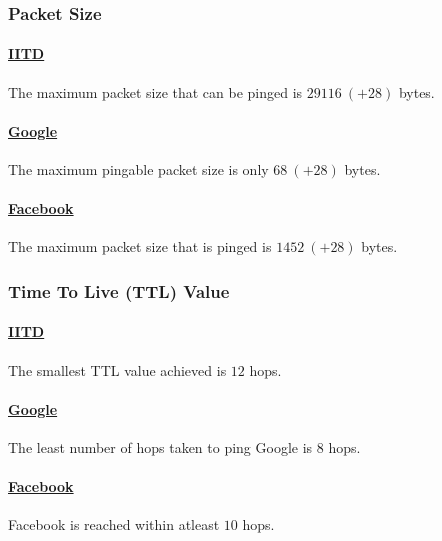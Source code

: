 \documentclass[11pt]{article}
\begin{document}
\subsubsection{Packet Size}

\paragraph{\href{https://www.iitd.ac.in}{IITD}} The maximum packet size that can be pinged is $29116\ (+28)$ bytes.
\paragraph{\href{https://www.google.com}{Google}} The maximum pingable packet size is only $68\ (+28)$ bytes.
\paragraph{\href{https://www.facebook.com}{Facebook}} The maximum packet size that is pinged is $1452\ (+28)$ bytes.

\subsubsection{Time To Live (TTL) Value}

\paragraph{\href{https://www.iitd.ac.in}{IITD}} The smallest TTL value achieved is $12$ hops.
\paragraph{\href{https://www.google.com}{Google}} The least number of hops taken to ping Google is $8$ hops.
\paragraph{\href{https://www.facebook.com}{Facebook}} Facebook is reached within atleast $10$ hops.
\end{document}
